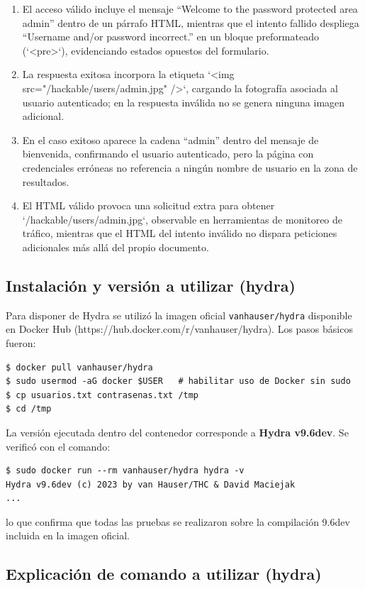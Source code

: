 \documentclass[letterpaper,12pt]{article}
\let\origsubsection\subsection
\renewcommand{\subsection}{\FloatBarrier\origsubsection}
\begin{document}
\begin{enumerate}
    \item El acceso válido incluye el mensaje ``Welcome to the password protected area admin'' dentro de un párrafo HTML, mientras que el intento fallido despliega ``Username and/or password incorrect.'' en un bloque preformateado (`<pre>`), evidenciando estados opuestos del formulario.
    \item La respuesta exitosa incorpora la etiqueta `<img src="/hackable/users/admin.jpg" />`, cargando la fotografía asociada al usuario autenticado; en la respuesta inválida no se genera ninguna imagen adicional.
    \item En el caso exitoso aparece la cadena ``admin'' dentro del mensaje de bienvenida, confirmando el usuario autenticado, pero la página con credenciales erróneas no referencia a ningún nombre de usuario en la zona de resultados.
    \item El HTML válido provoca una solicitud extra para obtener `/hackable/users/admin.jpg`, observable en herramientas de monitoreo de tráfico, mientras que el HTML del intento inválido no dispara peticiones adicionales más allá del propio documento.
\end{enumerate}

\subsection{Instalación y versión a utilizar (hydra)}
Para disponer de Hydra se utilizó la imagen oficial \texttt{vanhauser/hydra} disponible en Docker Hub (https://hub.docker.com/r/vanhauser/hydra). Los pasos básicos fueron:
\begin{verbatim}
$ docker pull vanhauser/hydra
$ sudo usermod -aG docker $USER   # habilitar uso de Docker sin sudo
$ cp usuarios.txt contrasenas.txt /tmp
$ cd /tmp
\end{verbatim}

La versión ejecutada dentro del contenedor corresponde a \textbf{Hydra v9.6dev}. Se verificó con el comando:
\begin{verbatim}
$ sudo docker run --rm vanhauser/hydra hydra -v
Hydra v9.6dev (c) 2023 by van Hauser/THC & David Maciejak
...
\end{verbatim}
lo que confirma que todas las pruebas se realizaron sobre la compilación 9.6dev incluida en la imagen oficial.




\subsection{Explicación de comando a utilizar (hydra)}
\end{document}
